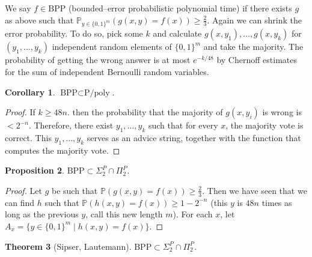 \documentclass{article}
\theoremstyle{definition}
\newtheorem{theorem}{Theorem}[section]
\newtheorem{cor}[theorem]{Corollary}
\newtheorem{prop}[theorem]{Proposition}
\begin{document}
We say $f \in \text{BPP}$ (bounded--error probabilistic polynomial time) if there exists $g$ as above such that $\mathbb{P}_{y \in \{0,1\}^m}(g(x,y)=f(x))\ge \frac{2}{3}$. Again we can shrink the error probability. To do so, pick some $k$ and calculate $g(x,y_1),\ldots,g(x,y_k)$ for $(y_1,\ldots,y_k)$ independent random elements of $\{0,1\}^m$ and take the majority. The probability of getting the wrong answer is at most $e^{-k/48}$ by Chernoff estimates for the sum of independent Bernoulli random variables.

\begin{cor}
    $\text{BPP} \subset \text{P/poly}$.
\end{cor}
\begin{proof}
    If $k \ge 48n$. then the probability that the majority of $g(x,y_i)$ is wrong is $<2^{-n}$. Therefore, there exist $y_1,\ldots,y_k$ such that for every $x$, the majority vote is correct. This $y_1,\ldots,y_k$ serves as an advice string, together with the function that computes the majority vote.
\end{proof}
\begin{prop}
    $\text{BPP} \subset \Sigma_2^P \cap \Pi_2^P$.
\end{prop}
\begin{proof}
    Let $g$ be such that $\mathbb{P}(g(x,y)=f(x))\ge \frac{2}{3}$. Then we have seen that we can find $h$ such that $\mathbb{P}(h(x,y)=f(x))\ge 1-2^{-n}$ (this $y$ is $48n$ times as long as the previous $y$, call this new length $m$). For each $x$, let $A_x = \{y \in \{0,1\}^m \mid h(x,y)=f(x)\}$.
\end{proof}
\begin{theorem}[Sipser, Lautemann]
    $\text{BPP} \subset \Sigma_2^P \cap \Pi_2^P$.
\end{theorem}
\end{document}
